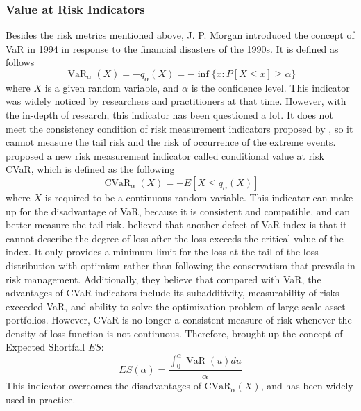 \subsubsection{Value at Risk Indicators}
Besides the risk metrics mentioned above, J. P. Morgan introduced the concept of VaR in 1994 in response to the financial disasters of the 1990s. It is defined as follows
\begin{equation}
\operatorname{VaR}_\alpha(X)=-q_\alpha(X)=-\inf \{x: P[X \leq x] \geq \alpha\}    
\end{equation}
where $X$ is a given random variable, and $\alpha$ is the confidence level.
This indicator was widely noticed by researchers and practitioners at that time. However, with the in-depth of research, this indicator has been questioned a lot. It does not meet the consistency condition of risk measurement indicators proposed by \cite{AP1999Coherentmeasures}, so it cannot measure the tail risk and the risk of occurrence of the extreme events. \cite{AP1999Coherentmeasures} proposed a new risk measurement indicator called conditional value at risk CVaR, which is defined as the following
\begin{equation}
 \operatorname{CVaR}_\alpha(X)=-E\left[X \leq q_\alpha(X)\right]   
\end{equation}
where $X$ is required to be a continuous random variable. This indicator can make up for the disadvantage of VaR, because it is consistent and compatible, and can better measure the tail risk. \cite{RR2002}believed that another defect of VaR index is that it cannot describe the degree of loss after the loss exceeds the critical value of the index. It only provides a minimum limit for the loss at the tail of the loss distribution with optimism rather than following the conservatism that prevails in risk management. Additionally, they believe that compared with VaR, the advantages of CVaR indicators include its subadditivity, measurability of risks exceeded VaR, and ability to solve the optimization problem of large-scale asset portfolios. However, CVaR is no longer a consistent measure of risk whenever the density of loss function is not continuous. Therefore, \cite{TD2002} brought up the concept of Expected Shortfall $ES$:
\begin{equation}
 ES(\alpha)=\frac{\int_0^\alpha \operatorname{VaR}(u) du}{\alpha}    
\end{equation}
This indicator overcomes the disadvantages of $\text{CVaR}_{\alpha}(X)$, and has been widely used in practice.
